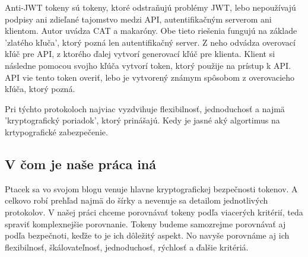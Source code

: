 Anti-JWT tokeny sú tokeny, ktoré odstraňujú problémy JWT, lebo nepoužívajú podpisy ani zdieľané tajomstvo medzi API, autentifikačným serverom ani klientom. Autor uvádza CAT a makaróny. Obe tieto riešenia fungujú na základe 'zlatého kľuča', ktorý pozná len autentifikačný server. Z neho odvádza overovací kľúč pre API, z ktorého ďalej vytvorí generovací kľúč pre klienta. Klient si následne pomocou svojho kľúča vytvorí token, ktorý použije na prístup k API. API vie tento token overiť, lebo je vytvorený známym spôsobom z overovacieho kľúča, ktorý pozná.

Pri týchto protokoloch najviac vyzdvihuje flexibilnosť, jednoduchosť a najmä 'kryptografický poriadok', ktorý prinášajú. Kedy je jasné aký algortimus na krtypografické zabezpečenie.

\subsection{V čom je naše práca iná}

Ptacek sa vo svojom blogu venuje hlavne kryptografickej bezpečnosti tokenov. A celkovo robí prehľad najmä do šírky a nevenuje sa detailom jednotlivých protokolov. V našej práci chceme porovnávať tokeny podľa viacerých kritérií, teda spraviť komplexnejšie porovnanie. Tokeny budeme samozrejme porovnávať aj podľa bezpečnoti, keďže to je ich dôležitý aspekt. No navyše porovnáme aj ich flexibilnosť, škálovateľnosť, jednoduchosť, rýchlosť a ďalšie kritériá.
